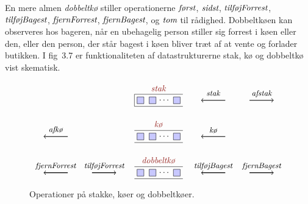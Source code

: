 En mere almen \emph{dobbeltkø} stiller operationerne
$\operatorname{\emph{først}}$,
$\operatorname{\emph{sidst}}$,
$\operatorname{\emph{tilføjForrest}}$, 
$\operatorname{\emph{tilføjBagest}}$, 
$\operatorname{\emph{fjernForrest}}$,
$\operatorname{\emph{fjernBagest}}$,
og $\operatorname{\emph{tom}}$ til rådighed.
Dobbeltkøen kan observeres hos bageren, når en ubehagelig person stiller sig forrest i køen eller den, eller den person, der står bagest i køen bliver træt af at vente og forlader butikken.
I fig~3.7 er funktionaliteten af datastrukturerne stak, kø og dobbeltkø vist skematisk.


\begin{figure}
  \[
  \begin{tikzpicture}[scale = .5]
    \node (0) at (0,0) [draw, fill=myblue, rectangle, inner sep = 4pt] {};
    \node (0) at (1,0) [draw, fill=myblue, rectangle, inner sep = 4pt] {};
    \node (0) at (2,0)  {$\cdots$};
    \node (0) at (3,0) [draw, fill = myblue, rectangle, inner sep = 4pt] {};
    \draw (3.5, .5) -- (-.5, .5) -- (-.5,-.5) -- (3.5, -.5);
    \node at (1.5,1) [callout] {\emph{stak}};
    \draw [->, thick] (7,0)--(5,0) node[midway, above] {\small $\varname{stak\vphantom j}$};
    \draw [->, thick] (9,0)--(11,0) node[midway, above] {\small $\varname{afstak}$};
    \begin{scope}[yshift = -3cm]
    \node (0) at (0,0) [draw, fill=myblue, rectangle, inner sep = 4pt] {};
    \node (0) at (1,0) [draw, fill=myblue, rectangle, inner sep = 4pt] {};
    \node (0) at (2,0)  {$\cdots$};
    \node (0) at (3,0) [draw, fill = myblue, rectangle, inner sep = 4pt] {};
    \draw (3.5, .5) -- (-.5, .5);
    \draw (-.5,-.5) -- (3.5, -.5);
    \node at (1.5,1) [callout] {\emph{kø}};
    \draw [->, thick] (7,0)--(5,0) node[midway, above] {\small $\varname{kø}$};
    \draw [->, thick] (-6,0)--(-8,0) node[midway, above] {\small $\varname{afkø}$};
    \end{scope}
    \begin{scope}[yshift = -6cm]
    \node (0) at (0,0) [draw, fill=myblue, rectangle, inner sep = 4pt] {};
    \node (0) at (1,0) [draw, fill=myblue, rectangle, inner sep = 4pt] {};
    \node (0) at (2,0)  {$\cdots$};
    \node (0) at (3,0) [draw, fill = myblue, rectangle, inner sep = 4pt] {};
    \draw (3.5, .5) -- (-.5, .5);
    \draw (-.5,-.5) -- (3.5, -.5);
    \node at (1.5,1) [callout] {\emph{dobbeltkø}};
    \draw [->, thick] (7,0)--(5,0) node[midway, above] {\small $\varname{tilføjBagest\vphantom j}$};
    \draw [->, thick] (9,0)--(11,0) node[midway, above] {\small $\varname{fjernBagest}$};
    \draw [->, thick] (-4,0)--(-2,0) node[midway, above] {\small $\varname{tilføjForrest}$};
    \draw [->, thick] (-6,0)--(-8,0) node[midway, above] {\small $\varname{fjernForrest}$};
    \end{scope}
  \end{tikzpicture}
\]
  \caption{Operationer på stakke, køer og dobbeltkøer.}
\end{figure}

